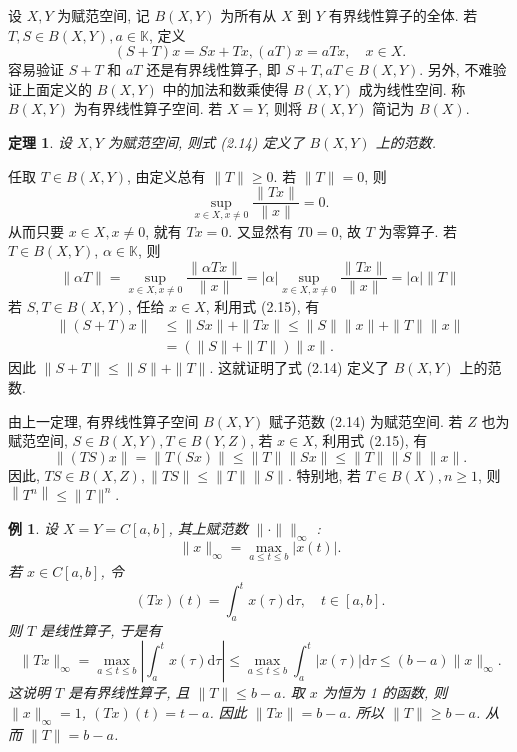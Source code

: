 \documentclass[openany]{ctexbook}
\makeatletter
\theoremstyle{kaiti}
\newtheorem{theorem}{定理}[section]
\theoremstyle{normal}
\newtheorem{example}{例}[section]
\renewenvironment{proof}[1][\proofname]{\par
    \pushQED{\qed}%
    \normalfont \topsep6\p@\@plus6\p@\relax
    \trivlist
    \item\relax
    {\heiti #1}\hspace{2\labelsep}\ignorespaces
  }{%
    \popQED\endtrivlist\@endpefalse
  }
\makeatother
\begin{document}
设 $X, Y$ 为赋范空间, 记 $B(X, Y)$ 为所有从 $X$ 到 $Y$ 有界线性算子的全体. 若 $T, S \in B(X, Y), a \in \mathbb{K}$, 定义
$$
(S+T) x=S x+T x,(a T) x=a T x, \quad x \in X.
$$
容易验证 $S+T$ 和 $a T$ 还是有界线性算子, 即 $S+T, a T \in B(X, Y)$. 另外, 不难验证上面定义的 $B(X, Y)$ 中的加法和数乘使得 $B(X, Y)$ 成为线性空间. 称 $B(X, Y)$ 为有界线性算子空间. 若 $X=Y$, 则将 $B(X, Y)$ 简记为 $B(X)$.

\begin{theorem}
  设 $X, Y$ 为赋范空间, 则式 (2.14) 定义了 $B(X, Y)$ 上的范数.
\end{theorem}

\begin{proof}
任取 $T \in B(X, Y)$, 由定义总有 $\|T\| \geqslant 0$. 若 $\|T\|=0$, 则
$$
\sup_{x \in X, x \neq 0} \frac{\|T x\|}{\|x\|}=0.
$$
从而只要 $x \in X, x \neq 0$, 就有 $T x=0$. 又显然有 $T 0=0$, 故 $T$ 为零算子. 若 $T \in B(X, Y)$, $\alpha \in \mathbb{K}$, 则
$$
\|\alpha T\|=\sup_{x \in X, x \neq 0} \frac{\|\alpha T x\|}{\|x\|}=|\alpha| \sup_{x \in X, x \neq 0} \frac{\|T x\|}{\|x\|}=|\alpha|\|T\|
$$
若 $S, T \in B(X, Y)$, 任给 $x \in X$, 利用式 (2.15), 有
$$
\begin{aligned}
\|(S+T) x\| & \leqslant\|S x\|+\|T x\| \leqslant\|S\|\|x\|+\|T\|\|x\| \\
&=(\|S\|+\|T\|)\|x\|.
\end{aligned}
$$
因此 $\|S+T\| \leqslant\|S\|+\|T\|$. 这就证明了式 (2.14) 定义了 $B(X, Y)$ 上的范数.
\end{proof}

由上一定理, 有界线性算子空间 $B(X, Y)$ 赋子范数 (2.14) 为赋范空间. 若 $Z$ 也为赋范空间, $S \in B(X, Y), T \in B(Y, Z)$, 若 $x \in X$, 利用式 (2.15), 有
$$
\|(T S) x\|=\|T(S x)\| \leqslant\|T\|\|S x\| \leqslant\|T\|\|S\|\|x\|.
$$
因此, $T S \in B(X, Z),\|T S\| \leqslant\|T\|\|S\|$. 特别地, 若 $T \in B(X), n \geqslant 1$, 则 $\left\|T^n\right\| \leqslant\|T\|^n$.

\begin{example}
设 $X=Y=C[a, b]$, 其上赋范数 $\|\cdot\| \|_{\infty}$ :
$$
\|x\|_{\infty}=\max_{a \leqslant t \leqslant b}|x(t)|.
$$
若 $x \in C[a, b]$, 令
$$
(T x)(t)=\int_{a}^{t} x(\tau) \mathrm{d} \tau, \quad t \in[a, b].
$$
则 $T$ 是线性算子, 于是有
$$
\|T x\|_{\infty}=\max_{a \leqslant t \leqslant b}\left|\int_{a}^{t} x(\tau) \mathrm{d} \tau\right| \leqslant \max_{a \leqslant t \leqslant b} \int_{a}^{t}|x(\tau)| \mathrm{d} \tau \leqslant(b-a)\|x\|_{\infty}.
$$
这说明 $T$ 是有界线性算子, 且 $\|T\| \leqslant b-a$. 取 $x$ 为恒为 1 的函数, 则 $\|x\|_{\infty}=1$, $(T x)(t)=t-a$. 因此 $\|T x\|=b-a$. 所以 $\|T\| \geqslant b-a$. 从而 $\|T\|=b-a$.
\end{example}
\end{document}
